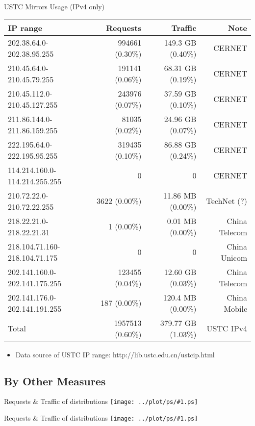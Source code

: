 \documentclass{beamer}
\newcommand\graph[1]{{\texttt{[image: ../plot/ps/\#1.ps]}}}
\begin{document}
\begin{frame}{USTC Mirrors Usage (IPv4 only)}
\begin{tabular}[t]{|>{\tiny}l|>{\small}r|>{\small}r|>{\tiny}r|}
\hline
IP range & Requests & Traffic & Note \\
\hline
202.38.64.0-202.38.95.255 & 994661 (0.30\%) & 149.3 GB (0.40\%) & CERNET \\
210.45.64.0-210.45.79.255 & 191141 (0.06\%) & 68.31 GB (0.19\%) & CERNET \\
210.45.112.0-210.45.127.255 & 243976 (0.07\%) & 37.59 GB (0.10\%) & CERNET \\
211.86.144.0-211.86.159.255 & 81035 (0.02\%) & 24.96 GB (0.07\%) & CERNET \\
222.195.64.0-222.195.95.255 & 319435 (0.10\%) & 86.88 GB (0.24\%) & CERNET \\
114.214.160.0-114.214.255.255 & 0 & 0 & CERNET \\
210.72.22.0-210.72.22.255 & 3622 (0.00\%) & 11.86 MB (0.00\%) & TechNet (?) \\
218.22.21.0-218.22.21.31 & 1 (0.00\%) & 0.01 MB (0.00\%) & China Telecom \\
218.104.71.160-218.104.71.175 & 0 & 0 & China Unicom \\
202.141.160.0-202.141.175.255 & 123455 (0.04\%) & 12.60 GB (0.03\%) & China Telecom \\
202.141.176.0-202.141.191.255 & 187 (0.00\%) & 120.4 MB (0.00\%) & China Mobile \\
Total & 1957513 (0.60\%) & 379.77 GB (1.03\%) & USTC IPv4 \\
\hline
\end{tabular}
\begin{itemize}
  \item \tiny{Data source of USTC IP range: http://lib.ustc.edu.cn/ustcip.html}
\end{itemize}
\end{frame}

\subsection{By Other Measures}

\begin{frame}{Requests \& Traffic of distributions}
\graph{req-dist}
\end{frame}

\begin{frame}{Requests \& Traffic of distributions}
\graph{req-dist-req}
\end{frame}
\end{document}

